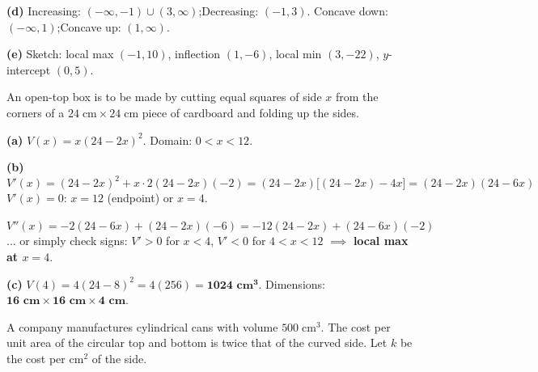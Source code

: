 \documentclass[addpoints]{exam}
\begin{document}
\begin{questions}
\begin{solution}[11cm]
\textbf{(d)} Increasing: $(-\infty,-1)\cup(3,\infty)$;\quad Decreasing: $(-1,3)$.
Concave down: $(-\infty,1)$;\quad Concave up: $(1,\infty)$.

\textbf{(e)} Sketch: local max $(-1,10)$, inflection $(1,-6)$, local min $(3,-22)$, $y$-intercept $(0,5)$.
\end{solution}

\question An open-top box is to be made by cutting equal squares of side $x$ from the
corners of a $24\;\text{cm} \times 24\;\text{cm}$ piece of cardboard and folding up the sides.
\begin{solution}[9cm]
\textbf{(a)} $V(x) = x(24 - 2x)^2$. Domain: $0 < x < 12$.

\textbf{(b)}
\[
V'(x) = (24-2x)^2 + x \cdot 2(24-2x)(-2) = (24-2x)\bigl[(24-2x) - 4x\bigr]
= (24-2x)(24-6x)
\]
$V'(x) = 0$: $x = 12$ (endpoint) or $x = 4$.

$V''(x) = -2(24-6x) + (24-2x)(-6) = -12(24-2x) + (24-6x)(-2)$... or simply check signs:
$V' > 0$ for $x < 4$, $V' < 0$ for $4 < x < 12$ $\implies$ \textbf{local max at $x = 4$}.

\textbf{(c)} $V(4) = 4(24-8)^2 = 4(256) = \mathbf{1024 \text{ cm}^3}$.
Dimensions: $\mathbf{16 \text{ cm} \times 16 \text{ cm} \times 4 \text{ cm}}$.
\end{solution}

\question A company manufactures cylindrical cans with volume $500\;\text{cm}^3$.
The cost per unit area of the circular top and bottom is twice that of the curved side.
Let $k$ be the cost per cm$^2$ of the side.
\end{questions}
\end{document}
